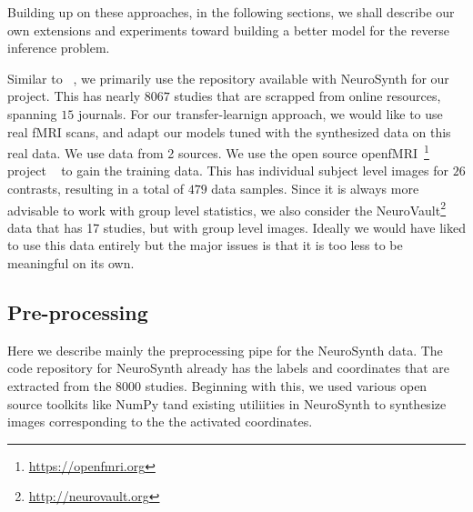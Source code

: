 \documentclass{article} %
\begin{document}
Building up on these approaches,  in the following sections, we shall describe our own extensions and experiments toward building a better model for the reverse inference problem.

Similar to ~\cite{yarkoni2011large}, we primarily use the repository available with NeuroSynth for our project. This has nearly $8067$ studies that are scrapped from online resources, spanning $15$ journals. For our transfer-learnign approach, we would like to use real fMRI scans, and adapt our models tuned with the synthesized data on this real data. We use data from 2 sources. We use the open source openfMRI~\footnote{\protect \url{https://openfmri.org}} project ~\cite{poldrack2013toward} to gain the training data. This has individual subject level images for $26$ contrasts, resulting in a total of $479$ data samples. Since it is always more advisable to work with group level statistics, we also consider the NeuroVault\footnote{\protect \url{http://neurovault.org}} data that has 17 studies, but with group level images. Ideally we would have liked to use this data entirely but the major issues is that it is too less to be meaningful on its own. 
\subsection{Pre-processing}
\label{sec:preprocess}
Here we describe mainly the preprocessing pipe for the NeuroSynth data. The code repository for NeuroSynth already has the labels and coordinates that are extracted from the $8000$ studies. Beginning with this, we used various open source toolkits like NumPy tand existing utiliities in NeuroSynth to synthesize images corresponding to the the activated coordinates. 
\end{document}

